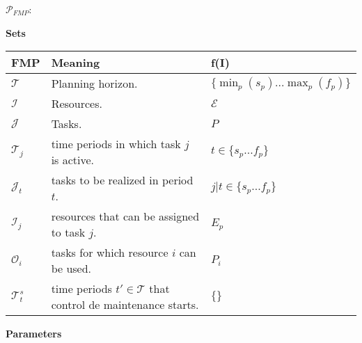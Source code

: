 \documentclass[a4paper,11pt]{article}
\begin{document}
    $\mathcal{P}_{FMP}$:

    \vskip 0.3cm

    \textbf{Sets}

    \begin{tabular}{l|l|l}
    	\textbf{FMP}    &  \textbf{Meaning} & \textbf{f(I)} \\ \hline
        $\mathcal{T}$    &  Planning horizon. & $\{\min_p({s_p}) ... \max_p({f_p})\}$ \\
        $\mathcal{I}$    &  Resources. & $ \mathcal{E}$ \\
        $\mathcal{J}$    &  Tasks.  & $ P$ \\
        $\mathcal{T}_j$  &  time periods in which task $j$ is active. & $t \in \{s_p ... f_p\}$ \\
        $\mathcal{J}_t$  &  tasks to be realized in period $t$. & $j | t \in \{s_p ... f_p\}$ \\
        $\mathcal{I}_j$  &  resources that can be assigned to task $j$. & $E_p$\\
        $\mathcal{O}_i$  &  tasks for which resource $i$ can be used. & $P_i$ \\
        $\mathcal{T}^{s}_t$ &  time periods $t' \in \mathcal{T}$ that control de maintenance starts. & $\{\}$ \\
    \end{tabular}

    \vskip 0.3cm

    \textbf{Parameters}
\end{document}
